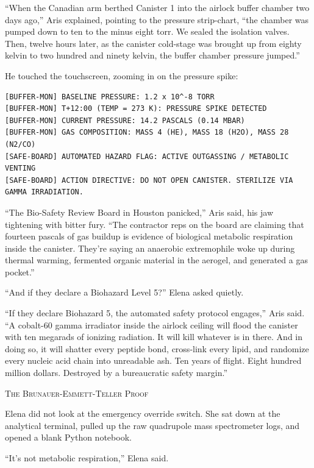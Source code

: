 \documentclass[12pt,twoside,openright]{book}
\newcommand{\sceneheader}[1]{%
  \par\vspace{1.8em}%
  {\noindent\centering\scshape\large #1\par}%
  \vspace{1.0em}%
  \noindent%
}
\newcommand{\dinkus}{%
  \par\vspace{1.2em}%
  {\noindent\centering{\large $\ast\quad\ast\quad\ast$}\par}%
  \vspace{1.2em}%
  \noindent%
}
\begin{document}
``When the Canadian arm berthed Canister 1 into the airlock buffer
chamber two days ago,'' Aris explained, pointing to the pressure
strip-chart, ``the chamber was pumped down to ten to the minus eight
torr. We sealed the isolation valves. Then, twelve hours later, as the
canister cold-stage was brought up from eighty kelvin to two hundred and
ninety kelvin, the buffer chamber pressure jumped.''

He touched the touchscreen, zooming in on the pressure spike:

\begin{lstlisting}
[BUFFER-MON] BASELINE PRESSURE: 1.2 x 10^-8 TORR
[BUFFER-MON] T+12:00 (TEMP = 273 K): PRESSURE SPIKE DETECTED
[BUFFER-MON] CURRENT PRESSURE: 14.2 PASCALS (0.14 MBAR)
[BUFFER-MON] GAS COMPOSITION: MASS 4 (HE), MASS 18 (H2O), MASS 28 (N2/CO)
[SAFE-BOARD] AUTOMATED HAZARD FLAG: ACTIVE OUTGASSING / METABOLIC VENTING
[SAFE-BOARD] ACTION DIRECTIVE: DO NOT OPEN CANISTER. STERILIZE VIA GAMMA IRRADIATION.
\end{lstlisting}

``The Bio-Safety Review Board in Houston panicked,'' Aris said, his jaw
tightening with bitter fury. ``The contractor reps on the board are
claiming that fourteen pascals of gas buildup is evidence of biological
metabolic respiration inside the canister. They're saying an anaerobic
extremophile woke up during thermal warming, fermented organic material
in the aerogel, and generated a gas pocket.''

``And if they declare a Biohazard Level 5?'' Elena asked quietly.

``If they declare Biohazard 5, the automated safety protocol engages,''
Aris said. ``A cobalt-60 gamma irradiator inside the airlock ceiling
will flood the canister with ten megarads of ionizing radiation. It will
kill whatever is in there. And in doing so, it will shatter every
peptide bond, cross-link every lipid, and randomize every nucleic acid
chain into unreadable ash. Ten years of flight. Eight hundred million
dollars. Destroyed by a bureaucratic safety margin.''

\dinkus

\sceneheader{The Brunauer-Emmett-Teller
Proof}

Elena did not look at the emergency override switch. She sat down at the
analytical terminal, pulled up the raw quadrupole mass spectrometer
logs, and opened a blank Python notebook.

``It's not metabolic respiration,'' Elena said.
\end{document}
